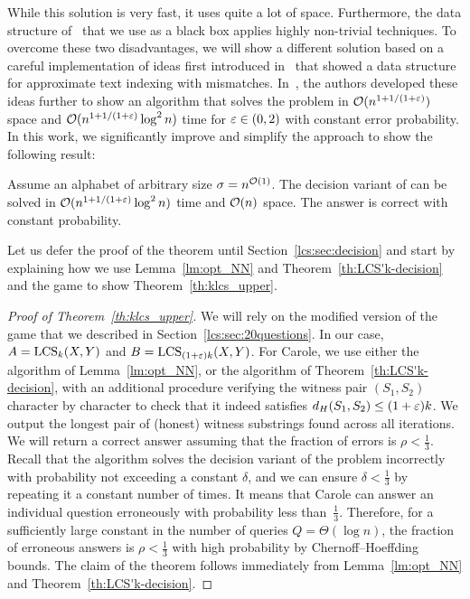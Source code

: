While this solution is very fast, it uses quite a lot of space. Furthermore, the data structure of~\cite{DBLP:conf/stoc/AndoniR15} that we use as a black box applies highly non-trivial techniques. To overcome these two disadvantages, we will show a different solution based on a careful implementation of ideas first introduced in~\cite{substringNN} that showed a data structure for approximate text indexing with mismatches. In~\cite{DBLP:journals/algorithmica/KociumakaRS19}, the authors developed these ideas further to show an algorithm that solves the \kApproxLCS problem in $\mathcal{O}(n^{1+1/(1+\varepsilon)} )$ space and $\mathcal{O} (n^{1+1/(1+\varepsilon)} \log^2 n)$ time for $\varepsilon\in(0,2)$ with constant error probability. In this work, we significantly improve and simplify the approach to show the following result:  

\begin{theorem}\label{th:LCS'k-decision}
Assume an alphabet of arbitrary size $\sigma = n^{\mathcal{O}(1)}$. The decision variant of \kApproxLCS can be solved in $\mathcal{O}(n^{1+1/(1+\varepsilon)} \log^2 n)$ time and $\mathcal{O}(n)$ space. The answer is correct with constant probability. 
\end{theorem}

Let us defer the proof of the theorem until Section~\ref{lcs:sec:decision} and start by explaining how we use Lemma~\ref{lm:opt_NN} and Theorem~\ref{th:LCS'k-decision} and the \twentyquestions game to show Theorem~\ref{th:klcs_upper}.

\begin{proof}[Proof of Theorem~\ref{th:klcs_upper}]
We will rely on the modified version of the \twentyquestions game that we
  described in Section~\ref{lcs:sec:20questions}. In our case, $A = \mathrm{LCS}_{k}(X,Y)$ and
  $B = \mathrm{LCS}_{(1+\varepsilon)k}(X,Y)$. For Carole, we use either the algorithm of
  Lemma~\ref{lm:opt_NN}, or the algorithm of Theorem~\ref{th:LCS'k-decision}, 
  with an additional procedure verifying the witness pair $(S_1,S_2)$ character by character to check that it indeed satisfies $d_H(S_1,S_2)\le (1+\varepsilon)k$.
  We output the longest pair of (honest) witness
  substrings found across all iterations. We will return a correct answer
  assuming that the fraction of errors is $\rho <\frac13$. Recall that the algorithm solves the decision variant of the \kApproxLCS problem incorrectly with probability not exceeding a constant $\delta$, and we can ensure $\delta < \frac13$ by repeating it a constant number of times. It means that Carole can answer an individual question erroneously with probability less than~$\frac13$. Therefore, for a sufficiently large constant in the number of queries $Q = \Theta(\log n)$, the fraction of erroneous answers is $\rho < \frac13$ with high probability by Chernoff--Hoeffding bounds. The claim of the theorem follows immediately from Lemma~\ref{lm:opt_NN} and Theorem~\ref{th:LCS'k-decision}.
\end{proof}

